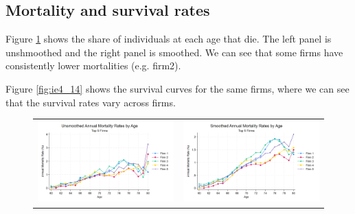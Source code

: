 \documentclass[12pt]{article}
\begin{document}
\subsection{Mortality and survival rates}


  
Figure \ref{fig:ie4_13} shows the share of individuals at each age that die. The left panel is unshmoothed and the right panel is smoothed. We can see that some firms have consistently lower mortalities (e.g. firm2). 

Figure \ref{fig:ie4_14} shows the survival curves for the same firms, where we can see that the survival rates vary across firms.
\begin{figure}[H]
\caption{}
\label{fig:ie4_13}
\centering{}%
\begin{tabular}{cc}
\includegraphics[scale=0.17]{../figures/IE4/IE4_mortality_rates_unsmoothed.png} 
& \includegraphics[scale=0.17]{../figures/IE4/IE4_mortality_rates_smoothed.png} 
\end{tabular}
\end{figure} 
 
\end{document}
